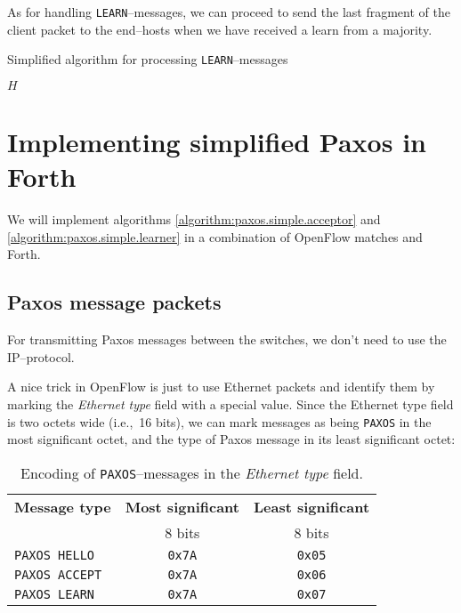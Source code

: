 As for handling \texttt{LEARN}--messages, we can proceed to send the last
fragment of the client packet to the end--hosts when we have received a
learn from a majority.

\begin{algorithm}
  \caption{Simplified algorithm for processing \texttt{LEARN}--messages}
  \label{algorithm:paxos.simple.learner}
  \begin{algorithmic}
    \State $H$ 
    \State

          \State {}
        \EndForIn
      \EndIf
    \EndOn
  \end{algorithmic}
\end{algorithm}

\section{Implementing simplified Paxos in Forth}

We will implement algorithms \ref{algorithm:paxos.simple.acceptor} 
and \ref{algorithm:paxos.simple.learner} in a combination of OpenFlow
matches and Forth.

\subsection{Paxos message packets}

For transmitting Paxos messages between the switches, we don't need to use
the IP--protocol.  

A nice trick in OpenFlow is just to use Ethernet packets
and identify them by marking the \textit{Ethernet type} field with a special value.
Since the Ethernet type field is two octets wide (i.e.,~16 bits), we can
mark messages as being \texttt{PAXOS} in the most significant octet, and the
type of Paxos message in its least significant octet:

\begin{table}[H]
  \centering
  \begin{tabular}{|l|c|c|}
    \hline \textbf{Message type} &
           \textbf{Most significant} &
           \textbf{Least significant} \\

           & 8 bits & 8 bits \\

    \hline \texttt{PAXOS HELLO}  & \texttt{0x7A} & \texttt{0x05} \\
    \hline \texttt{PAXOS ACCEPT} & \texttt{0x7A} & \texttt{0x06} \\
    \hline \texttt{PAXOS LEARN}  & \texttt{0x7A} & \texttt{0x07} \\
    \hline
  \end{tabular}
  \caption{Encoding of \texttt{PAXOS}--messages in the \textit{Ethernet
    type} field.}
  \label{table:paxos.ethernet.type.encoding}
\end{table}

